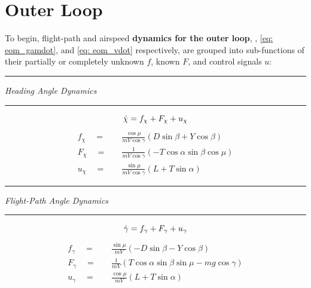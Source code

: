 \documentclass[12pt]{ucthesis}
\begin{document}
\section{Outer Loop}
\label{sec: uav_outer_loop}
%
To begin, flight-path and airspeed \textbf{dynamics for the outer loop}, , \ref{eq: eom_gamdot}, and \ref{eq: eom_vdot} respectively, are grouped into sub-functions of their partially or completely unknown $f$, known $F$, and control signals $u$:

\newpage
\begin{center} {\color{lightgray}\rule[2pt]{2.25in}{1pt}} \noindent \textit{Heading Angle Dynamics} {\color{lightgray}\rule[2pt]{2.25in}{1pt}}  \end{center}
	\begin{equation} \label{eq: cfbs_chidot}
		\dot{\chi} = f_{\chi} + F_{\chi} + u_{\chi} \\
	\end{equation}
	\begin{align}
		\label{eq: cfbs_fx}		f_{\chi} \quad =& \quad 	\frac{\cos\mu}{mV\cos\gamma}\left( D\sin\beta+ Y\cos\beta \right) \\
		\label{eq: cfbs_Fx}		F_{\chi} \quad =& \quad 	\frac{1}{mV\cos\gamma} \left( -T\cos\alpha\sin\beta\cos\mu \right) \\
		\label{eq: cfbs_ux}		u_{\chi} \quad =& \quad 	\frac{\sin\mu}{mV\cos\gamma} \left( L+T\sin\alpha \right)
	\end{align}%
\begin{center} {\color{lightgray}\rule[2pt]{2.125in}{1pt}} \textit{Flight-Path Angle Dynamics} {\color{lightgray}\rule[2pt]{2.125in}{1pt}}  \end{center}
	\begin{equation} \label{eq: cfbs_gamdot}
		\dot{\gamma} = f_{\gamma} + F_{\gamma} + u_{\gamma} \\
	\end{equation}
	\begin{align}
		\label{eq: cfbs_fg}		f_{\gamma} \quad =& \quad 	\frac{\sin\mu}{mV} \left( -D\sin\beta - Y\cos\beta \right)  \\
		\label{eq: cfbs_Fg}		F_{\gamma} \quad =& \quad 	\frac{1}{mV} \left( T \cos\alpha\sin\beta\sin\mu - mg\cos\gamma \right) \\
		\label{eq: cfbs_ug}		u_{\gamma} \quad =& \quad 	\frac{\cos\mu}{mV} \left( L+T\sin\alpha \right) 
	\end{align}%
\end{document}
